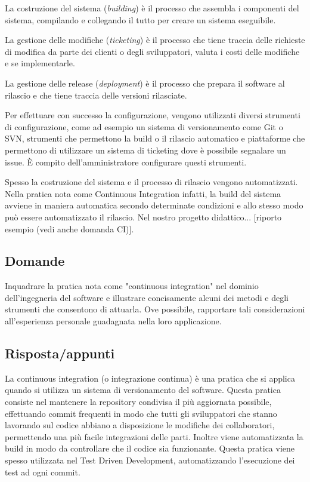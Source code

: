 La costruzione del sistema (\textit{building}) è il processo che assembla i componenti del sistema, compilando e collegando il tutto per creare un sistema eseguibile.

La gestione delle modifiche (\textit{ticketing}) è il processo che tiene traccia delle richieste di modifica da parte dei clienti o degli sviluppatori, valuta i costi delle modifiche e se implementarle.

La gestione delle release (\textit{deployment}) è il processo che prepara il software al rilascio e che tiene traccia delle versioni rilasciate. 

Per effettuare con successo la configurazione, vengono utilizzati diversi strumenti di configurazione, come ad esempio un sistema di versionamento come Git o SVN, strumenti che permettono la build o il rilascio automatico e piattaforme che permettono di utilizzare un sistema di ticketing dove è possibile segnalare un issue. \`E compito dell'amministratore configurare questi strumenti.

Spesso la costruzione del sistema e il processo di rilascio vengono automatizzati. Nella pratica nota come Continuous Integration infatti, la build del sistema avviene in maniera automatica secondo determinate condizioni e allo stesso modo può essere automatizzato il rilascio. Nel nostro progetto didattico... [riporto esempio (vedi anche domanda CI)].











\subsection*{Domande} %
Inquadrare la pratica nota come "continuous integration" nel dominio dell'ingegneria del software e illustrare concisamente alcuni dei metodi e degli strumenti che consentono di attuarla. Ove possibile, rapportare tali considerazioni all'esperienza personale guadagnata nella loro applicazione.

\subsection*{Risposta/appunti} %
La continuous integration (o integrazione continua) è una pratica che si applica quando si utilizza un sistema di versionamento del software. Questa pratica consiste nel mantenere la repository condivisa il più aggiornata possibile, effettuando commit frequenti in modo che tutti gli sviluppatori che stanno lavorando sul codice abbiano a disposizione le modifiche dei collaboratori, permettendo una più facile integrazioni delle parti. Inoltre viene automatizzata la build in modo da controllare che il codice sia funzionante. Questa pratica viene spesso utilizzata nel Test Driven Development, automatizzando l'esecuzione dei test ad ogni commit.

